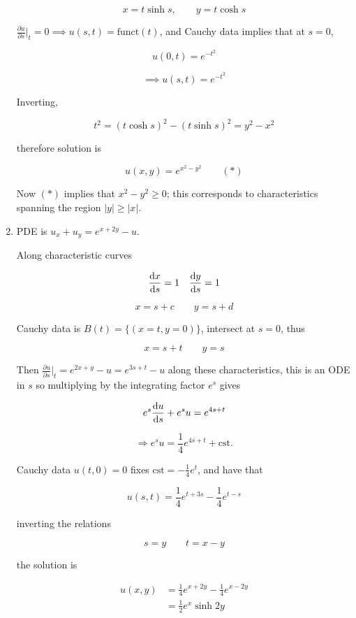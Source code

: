\documentclass[a4paper]{article}
\begin{document}
\begin{enumerate}
	\[ x = t \sinh s, \qquad y = t \cosh s \]
	
	$ \frac{\partial u}{\partial s} \big|_{t} = 0 \implies u(s,t) = \text{funct}(t) $, and Cauchy data implies that at $ s = 0 $, 
	
	\[ u(0,t) = e^{-t^{2}} \]
	
	\[ \implies u(s,t) = e^{-t^{2}} \]
	
	Inverting,
	
	\[ t^{2} = (t \cosh s)^{2} - (t \sinh s)^{2} = y^{2} - x^{2} \]
	
	therefore solution is
	
	\[ u(x,y) = e^{x^{2} - y^{2}} \qquad (*) \]
	
	Now $ (*) $ implies that $ x^{2} - y^{2} \geq 0 $; this corresponds to characteristics spanning the region $ | y | \geq | x | $.
	
	\item PDE is $ u_{x} + u_{y} = e^{x + 2y} - u $.
	
	Along characteristic curves
	
	\[ \frac{\mathrm{d} x}{\mathrm{d} s} = 1 \quad \frac{\mathrm{d} y}{\mathrm{d} s} = 1  \]
	
	
	\[ x = s + c \qquad y = s + d \]
	
	Cauchy data is $ B(t) = \{ (x = t, y = 0) \} $, intersect at $ s = 0 $, thus
	
	\[ x = s + t  \qquad y = s \]

	Then $ \frac{\partial u }{\partial s} \Big|_{t} = e^{2x + y} - u = e^{3s + t} - u $ along these characteristics, this is an ODE in $ s $ so multiplying by the integrating factor $ e^{s} $ gives
	
	\[ e^{s} \frac{\mathrm{d} u}{\mathrm{d} s} + e^{s} u = e^{4s + t}  \]
	
	\[ \Rightarrow e^{s} u = \frac{1}{4} e^{4s + t } + \text{cst.} \]
	
	Cauchy data  $ u(t,0) = 0 $ fixes $ \text{cst} = -  \frac{1}{4} e^{t} $, and have that
	
	\[ u(s,t) = \frac{1}{4} e^{t  + 3s} -  \frac{1}{4} e^{t-s}  \]


	inverting the relations
	
	\[ s = y \qquad t = x - y \]
	
	the solution is
	
	\begin{align*}
	u(x,y) & = \frac{1}{4}e^{x + 2y} - \frac{1}{4} e^{x - 2y}  \\
	& = \frac{1}{2}e^{x} \sinh 2y
	\end{align*}
	
\end{enumerate}
\end{document}
